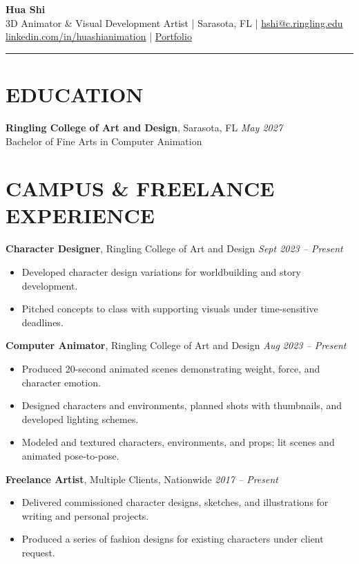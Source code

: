 \documentclass[11pt]{article}
\begin{document}
\begin{center}
    {\LARGE \textbf{Hua Shi}}\\
    \vspace{4pt}
    3D Animator \& Visual Development Artist \;|\; Sarasota, FL \;|\; \href{mailto:hshi@c.ringling.edu}{hshi@c.ringling.edu}\\
    \href{https://www.linkedin.com/in/huashianimation}{linkedin.com/in/huashianimation} \;|\; \href{https://hua-shi-portfolio.netlify.app/}{Portfolio}
\end{center}

\vspace{6pt}
\noindent\rule{\textwidth}{0.4pt}

\section*{EDUCATION}
\textbf{Ringling College of Art and Design}, Sarasota, FL \hfill \textit{May 2027}\\
Bachelor of Fine Arts in Computer Animation

\section*{CAMPUS \& FREELANCE EXPERIENCE}
\textbf{Character Designer}, Ringling College of Art and Design \hfill \textit{Sept 2023 -- Present}
\begin{itemize}
    \item Developed character design variations for worldbuilding and story development.
    \item Pitched concepts to class with supporting visuals under time-sensitive deadlines.
\end{itemize}

\textbf{Computer Animator}, Ringling College of Art and Design \hfill \textit{Aug 2023 -- Present}
\begin{itemize}
    \item Produced 20-second animated scenes demonstrating weight, force, and character emotion.
    \item Designed characters and environments, planned shots with thumbnails, and developed lighting schemes.
    \item Modeled and textured characters, environments, and props; lit scenes and animated pose-to-pose.
\end{itemize}

\textbf{Freelance Artist}, Multiple Clients, Nationwide \hfill \textit{2017 -- Present}
\begin{itemize}
    \item Delivered commissioned character designs, sketches, and illustrations for writing and personal projects.
    \item Produced a series of fashion designs for existing characters under client request.
\end{itemize}
\end{document}

